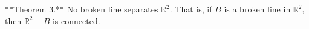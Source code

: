 **Theorem 3.** No broken line separates $\mathbb{R}^2$. That is, if $B$ is a broken line in $\mathbb{R}^2$, then $\mathbb{R}^2 - B$ is connected.
